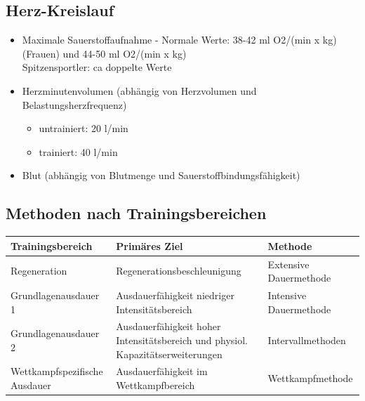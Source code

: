 \subsection{Herz-Kreislauf}
\begin{itemize}
  \item Maximale Sauerstoffaufnahme - Normale Werte: 38-42 ml O2/(min x kg) (Frauen) und 44-50 ml O2/(min x kg) \\
    Spitzensportler: ca doppelte Werte
  \item Herzminutenvolumen (abhängig von Herzvolumen und Belastungsherzfrequenz)
    \begin{itemize}
      \item untrainiert: 20 l/min
      \item trainiert: 40 l/min
    \end{itemize}
  \item Blut (abhängig von Blutmenge und Sauerstoffbindungsfähigkeit)
\end{itemize}

\subsection{Methoden nach Trainingsbereichen}
\begin{centering}
\begin{tabular}{m{} | m{} | m{}}
   Trainingsbereich              & Primäres Ziel                                                                   & Methode \\ \hline
   Regeneration                  & Regenerationsbeschleunigung                                                     & Extensive Dauermethode \\ \hline
   Grundlagenausdauer 1          & Ausdauerfähigkeit niedriger Intensitätsbereich                                  & Intensive Dauermethode \\ \hline
   Grundlagenausdauer 2          & Ausdauerfähigkeit hoher Intensitätsbereich und physiol. Kapazitätserweiterungen & Intervallmethoden \\ \hline
   Wettkampfspezifische \newline Ausdauer & Ausdauerfähigkeit im Wettkampfbereich                                           & Wettkampfmethode \\
\end{tabular}
\end{centering}

